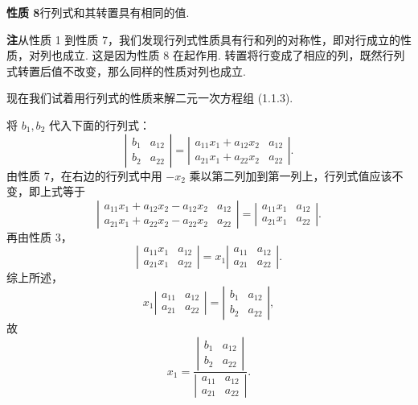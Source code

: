 \documentclass[UTF8,12pt,a4paper,fontset=fandol]{ctexart}
\begin{document}
\noindent\textbf{性质 8}\quad 行列式和其转置具有相同的值.

\noindent\textbf{注}\quad 从性质 1 到性质 7，我们发现行列式性质具有行和列的对称性，即对行成立的性质，对列也成立. 这是因为性质 8 在起作用. 转置将行变成了相应的列，既然行列式转置后值不改变，那么同样的性质对列也成立.

现在我们试着用行列式的性质来解二元一次方程组 (1.1.3).

将 $b_1,b_2$ 代入下面的行列式：
\[
\left|\begin{array}{cc}
b_1 & a_{12}\\
b_2 & a_{22}
\end{array}\right|
=
\left|\begin{array}{cc}
a_{11}x_1+a_{12}x_2 & a_{12}\\
a_{21}x_1+a_{22}x_2 & a_{22}
\end{array}\right|.
\]
由性质 7，在右边的行列式中用 $-x_2$ 乘以第二列加到第一列上，行列式值应该不变，即上式等于
\[
\left|\begin{array}{cc}
a_{11}x_1+a_{12}x_2-a_{12}x_2 & a_{12}\\
a_{21}x_1+a_{22}x_2-a_{22}x_2 & a_{22}
\end{array}\right|
=
\left|\begin{array}{cc}
a_{11}x_1 & a_{12}\\
a_{21}x_1 & a_{22}
\end{array}\right|.
\]
再由性质 3，
\[
\left|\begin{array}{cc}
a_{11}x_1 & a_{12}\\
a_{21}x_1 & a_{22}
\end{array}\right|
=x_1
\left|\begin{array}{cc}
a_{11} & a_{12}\\
a_{21} & a_{22}
\end{array}\right|.
\]
综上所述，
\[
x_1
\left|\begin{array}{cc}
a_{11} & a_{12}\\
a_{21} & a_{22}
\end{array}\right|
=
\left|\begin{array}{cc}
b_1 & a_{12}\\
b_2 & a_{22}
\end{array}\right|,
\]
故
\[
x_1=
\frac{
\left|\begin{array}{cc}
b_1 & a_{12}\\
b_2 & a_{22}
\end{array}\right|}
{\left|\begin{array}{cc}
a_{11} & a_{12}\\
a_{21} & a_{22}
\end{array}\right|}.
\]
\end{document}
